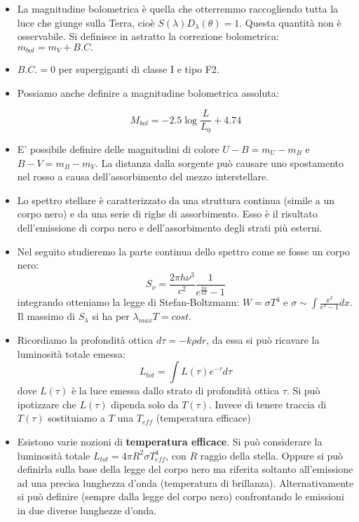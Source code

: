 \documentclass[11pt,a4paper]{article}
\begin{document}
\begin{itemize}
\item La magnitudine bolometrica è quella che otterremmo raccogliendo tutta la luce che giunge sulla Terra, cioè $S(\lambda) D_{\lambda} (\theta) = 1$. Questa quantità non è osservabile. Si definisce in astratto la correzione bolometrica: $m_{bol} = m_{V} + B.C.$

\item $B.C. = 0$ per supergiganti di classe I e tipo F2.

\item Possiamo anche definire a magnitudine bolometrica assoluta:

\begin{equation}
M_{bol} = -2.5 \log \frac{L}{L_0} + 4.74
\end{equation}

\item E' possibile definire delle magnitudini di colore $U-B = m_U - m_B$ e $B-V = m_B - m_V$. La distanza dalla sorgente può causare uno spostamento nel rosso a causa dell'assorbimento del mezzo interstellare.

\item Lo spettro stellare è caratterizzato da una struttura continua (simile a un corpo nero) e da una serie di righe di assorbimento. Esso è il risultato dell'emissione di corpo nero e dell'assorbimento degli strati più esterni.

\item Nel seguito studieremo la parte continua dello spettro come se fosse un corpo nero:
\begin{equation}
S_{\nu} = \frac{2 \pi h \nu^3}{c^2} \frac{1}{e^{\frac{h \nu}{k T}} - 1}
\end{equation}
integrando otteniamo la legge di Stefan-Boltzmann: $W = \sigma T^4$ e $\sigma \sim \int \frac{x^3}{e^x - 1} dx$.
Il massimo di $S_{\lambda}$ si ha per $\lambda_{max} T = cost.$

\item Ricordiamo la profondità ottica $d \tau = - k \rho dr$, da essa si può ricavare la luminosità totale emessa:
\begin{equation}
L_{tot} = 	\int L(\tau) e^{-\tau} d \tau
\end{equation}
dove $L(\tau)$ è la luce emessa dallo strato di profondità ottica $\tau$. Si può ipotizzare che $L(\tau)$ dipenda solo da $T(\tau)$. Invece di tenere traccia di $T \left( \tau \right)$ sostituiamo a $T$ una $T_{eff}$ (temperatura efficace)

\item Esistono varie nozioni di \textbf{temperatura efficace}. Si può considerare la luminosità totale $L_{tot} = 4 \pi R^2 \sigma T^{4}_{eff}$, con $R$ raggio della stella. Oppure si può definirla sulla base della legge del corpo nero ma riferita soltanto all'emissione ad una precisa lunghezza d'onda (temperatura di brillanza). Alternativamente si può definire (sempre dalla legge del corpo nero) confrontando le emissioni in due diverse lunghezze d'onda.


\end{itemize}
\end{document}
